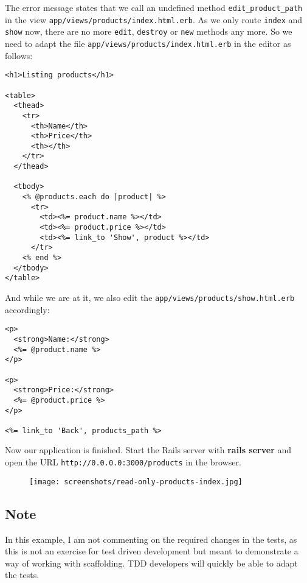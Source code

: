 \documentclass[a4paper]{book}
\newcounter{tab}[chapter]
\begin{document}
The error message states that we call an undefined method \texttt{edit\_product\_path} in the view \texttt{app/views/products/index.html.erb}. As we only route \texttt{index} and \texttt{show} now, there are no more \texttt{edit}, \texttt{destroy} or \texttt{new} methods any more. So we need to adapt the file \texttt{app/views/products/index.html.erb} in the editor as follows:

\begin{shaded}\begin{verbatim}
<h1>Listing products</h1>

<table>
  <thead>
    <tr>
      <th>Name</th>
      <th>Price</th>
      <th></th>
    </tr>
  </thead>

  <tbody>
    <% @products.each do |product| %>
      <tr>
        <td><%= product.name %></td>
        <td><%= product.price %></td>
        <td><%= link_to 'Show', product %></td>
      </tr>
    <% end %>
  </tbody>
</table>
\end{verbatim}\end{shaded}

And while we are at it, we also edit the \texttt{app/views/products/show.html.erb} accordingly:

\begin{shaded}\begin{verbatim}
<p>
  <strong>Name:</strong>
  <%= @product.name %>
</p>

<p>
  <strong>Price:</strong>
  <%= @product.price %>
</p>

<%= link_to 'Back', products_path %>
\end{verbatim}\end{shaded}

Now our application is finished. Start the Rails server with \textbf{rails server} and open the URL \texttt{http://0.0.0.0:3000/products} in the browser.

\begin{figure}[htbp]
\centering
\texttt{[image: screenshots/read-only-products-index.jpg]}
\end{figure}

\subsection{Note}\label{note-35}

In this example, I am not commenting on the required changes in the tests, as this is not an exercise for test driven development but meant to demonstrate a way of working with scaffolding. TDD developers will quickly be able to adapt the tests.
\end{document}
